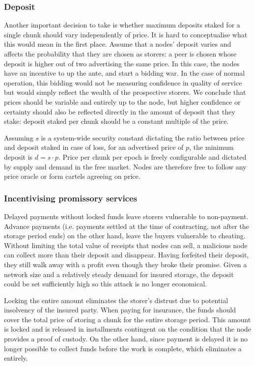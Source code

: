 \subsubsection{Deposit}

Another important decision to take is whether maximum deposits staked for a single chunk should vary independently of price. It is hard to conceptualise what this would mean in the first place. Assume that a nodes' deposit varies and affects the probability that they are chosen as storers: a peer is chosen whose deposit is higher out of two advertising the same price. In this case, the nodes have an incentive to up the ante, and start a bidding war. In the case of normal operation, this bidding would not be measuring confidence in quality of service but would simply reflect the wealth of the prospective storers. We conclude that prices should be variable and entirely up to the node, but higher confidence or certainty should also be reflected directly in the amount of deposit that they stake: deposit staked per chunk should be a constant multiple of the price.

Assuming $s$ is a system-wide security constant dictating the ratio between price and deposit staked in case of loss, for an advertised price of $p$, the minimum deposit is $d=s\cdot p$. Price per chunk per epoch is freely configurable and dictated by supply and demand in the free market. Nodes are therefore free to follow any price oracle or form cartels agreeing on price.

\subsubsection{Incentivising promissory services}

Delayed payments without locked funds leave storers vulnerable to non-payment. Advance payments (i.e. payments settled at the time of contracting, not after the storage period ends) on the other hand, leave the buyers vulnerable to cheating. Without limiting the total value of receipts that nodes can sell, a malicious node can collect more than their deposit and disappear. Having forfeited their deposit, they still walk away with a profit even though they broke their promise. Given a network size and a relatively steady demand for insured storage, the deposit could be set sufficiently high so this attack is no longer economical.

Locking the entire amount eliminates the storer's distrust due to potential insolvency of the insured party. When paying for insurance, the funds should cover the total price of storing a chunk for the entire storage period. This amount is locked and is released in installments contingent on the condition that the node provides a proof of custody. On the other hand, since payment is delayed it is no longer possible to collect funds before the work is complete, which eliminates a  entirely.

